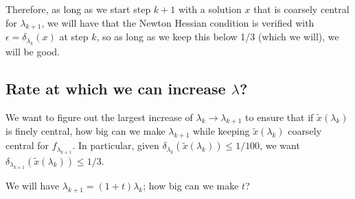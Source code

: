 \documentclass[11pt]{article}
\newcommand{\ep}{\epsilon}
\newcommand{\ra}{\rightarrow}
\begin{document}
Therefore, as long as we start step $k+1$ with a solution $x$ that is coarsely central for $\lambda_{k+1}$, we will have that the Newton Hessian condition is verified with $\ep = \delta_{\lambda_k}(x)$ at step $k$, so as long as we keep this below 1/3 (which we will), we will be good.

\subsection{Rate at which we can increase $\lambda$?}
We want to figure out the largest increase of $\lambda_k \ra \lambda_{k+1}$ to ensure that if $\tilde x(\lambda_k)$ is finely central, how big can we make $\lambda_{k+1}$ while keeping $\tilde x(\lambda_k)$ coarsely central for $f_{\lambda_{k+1}}$. In particular, given $\delta_{\lambda_k}(\tilde x(\lambda_k)) \leq 1/100$, we want $\delta_{\lambda_{k+1}}(\tilde x(\lambda_k)) \leq 1/3$.

We will have $\lambda_{k+1} = (1+t) \lambda_k$; how big can we make $t$?
\end{document}

